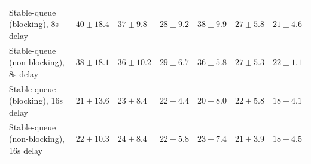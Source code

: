 \begin{table}[H]
{\begin{tabular}{l w{c}{5.0em} w{c}{5.0em} w{c}{5.0em} w{c}{5.0em} w{c}{5.0em} w{c}{5.0em}}
Stable-queue (blocking), 8s delay & $40\pm18.4$ & $37\pm9.8$ & $28\pm9.2$ & $38\pm9.9$ & $27\pm5.8$ & $21\pm4.6$ \\
Stable-queue (non-blocking), 8s delay & $38\pm18.1$ & $36\pm10.2$ & $29\pm6.7$ & $36\pm5.8$ & $27\pm5.3$ & $22\pm1.1$ \\
Stable-queue (blocking), 16s delay & $21\pm13.6$ & $23\pm8.4$ & $22\pm4.4$ & $20\pm8.0$ & $22\pm5.8$ & $18\pm4.1$ \\
Stable-queue (non-blocking), 16s delay & $22\pm10.3$ & $24\pm8.4$ & $22\pm5.8$ & $23\pm7.4$ & $21\pm3.9$ & $18\pm4.5$ \\
\bottomrule
\end{tabular}%
}
\end{table}
